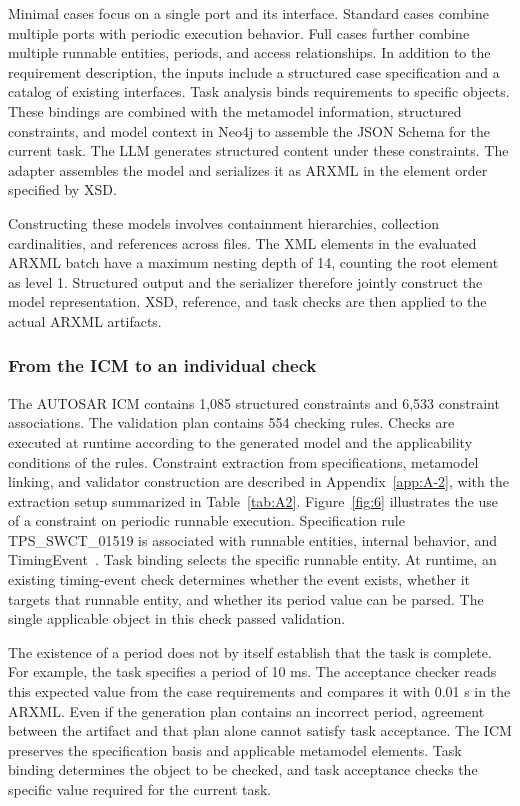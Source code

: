 \documentclass[pdflatex,iicol,sn-mathphys-num]{sn-jnl}
\newcommand{\paperref}[1]{~\citep{#1}}
\begin{document}
Minimal cases focus on a single port and its interface. Standard cases combine multiple ports with periodic execution behavior. Full cases further combine multiple runnable entities, periods, and access relationships. In addition to the requirement description, the inputs include a structured case specification and a catalog of existing interfaces. Task analysis binds requirements to specific objects. These bindings are combined with the metamodel information, structured constraints, and model context in Neo4j to assemble the JSON Schema for the current task. The LLM generates structured content under these constraints. The adapter assembles the model and serializes it as ARXML in the element order specified by XSD.


Constructing these models involves containment hierarchies, collection cardinalities, and references across files. The XML elements in the evaluated ARXML batch have a maximum nesting depth of 14, counting the root element as level 1. Structured output and the serializer therefore jointly construct the model representation. XSD, reference, and task checks are then applied to the actual ARXML artifacts.


\subsubsection{From the ICM to an individual check}\label{sec:eval-4-2-2}

The AUTOSAR ICM contains 1,085 structured constraints and 6,533 constraint associations. The validation plan contains 554 checking rules. Checks are executed at runtime according to the generated model and the applicability conditions of the rules. Constraint extraction from specifications, metamodel linking, and validator construction are described in Appendix~\ref{app:A-2}, with the extraction setup summarized in Table~\ref{tab:A2}. Figure~\ref{fig:6} illustrates the use of a constraint on periodic runnable execution. Specification rule TPS\_SWCT\_01519 is associated with runnable entities, internal behavior, and TimingEvent\paperref{AUTOSAR2015SoftwareComponentTemplate422}. Task binding selects the specific runnable entity. At runtime, an existing timing-event check determines whether the event exists, whether it targets that runnable entity, and whether its period value can be parsed. The single applicable object in this check passed validation.


The existence of a period does not by itself establish that the task is complete. For example, the task specifies a period of 10 ms. The acceptance checker reads this expected value from the case requirements and compares it with 0.01 s in the ARXML. Even if the generation plan contains an incorrect period, agreement between the artifact and that plan alone cannot satisfy task acceptance. The ICM preserves the specification basis and applicable metamodel elements. Task binding determines the object to be checked, and task acceptance checks the specific value required for the current task.
\end{document}
